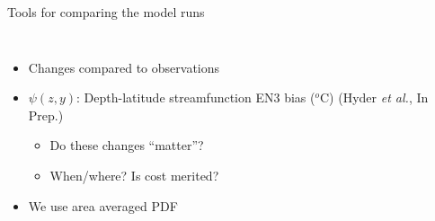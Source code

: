 \documentclass{beamer}
\begin{document}
\begin{frame}{Tools for comparing the model runs}
\begin{columns}[c]
\column{3in}
\begin{itemize}
 \item Changes compared to observations
 \item $\psi(z, y)$: Depth-latitude streamfunction EN3 bias ($^{o}$C) \small (Hyder \textit{et al.}, In Prep.)
 \begin{itemize}
  \item Do these changes ``matter''?
  \item When/where? Is cost \alert{merited}?
 \end{itemize}
 \item We use area averaged PDF%
\end{itemize}
\end{columns}
\end{frame}




\end{document}
